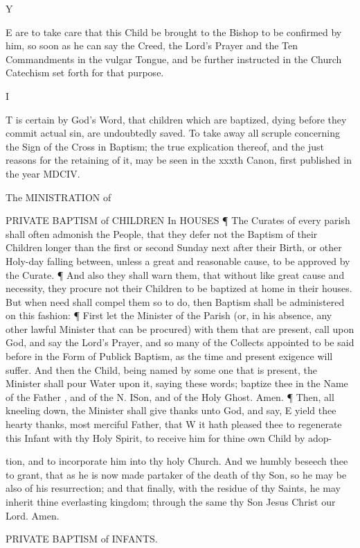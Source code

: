 Y

E are to take care that this Child be brought to the Bishop to be confirmed by him, so soon as he can say the Creed, the Lord’s Prayer and the Ten Commandments in the vulgar Tongue, and be further instructed in the Church Catechism set forth for that purpose.

I

T is certain by God’s Word, that children which are baptized, dying before they commit actual sin, are undoubtedly saved. To take away all scruple concerning the Sign of the Cross in Baptism; the true explication thereof, and the just reasons for the retaining of it, may be seen in the xxxth Canon, first published in the year MDCIV.

The MINISTRATION of

PRIVATE BAPTISM of CHILDREN In HOUSES ¶ The Curates of every parish shall often admonish the People, that they defer not the Baptism of their Children longer than the first or second Sunday next after their Birth, or other Holy-day falling between, unless a great and reasonable cause, to be approved by the Curate. ¶ And also they shall warn them, that without like great cause and necessity, they procure not their Children to be baptized at home in their houses. But when need shall compel them so to do, then Baptism shall be administered on this fashion: ¶ First let the Minister of the Parish (or, in his absence, any other lawful Minister that can be procured) with them that are present, call upon God, and say the Lord’s Prayer, and so many of the Collects appointed to be said before in the Form of Publick Baptism, as the time and present exigence will suffer. And then the Child, being named by some one that is present, the Minister shall pour Water upon it, saying these words; baptize thee in the Name of the Father , and of the N. ISon, and of the Holy Ghost. Amen. ¶ Then, all kneeling down, the Minister shall give thanks unto God, and say, E yield thee hearty thanks, most merciful Father, that W it hath pleased thee to regenerate this Infant with thy Holy Spirit, to receive him for thine own Child by adop-

tion, and to incorporate him into thy holy Church. And we humbly beseech thee to grant, that as he is now made partaker of the death of thy Son, so he may be also of his resurrection; and that finally, with the residue of thy Saints, he may inherit thine everlasting kingdom; through the same thy Son Jesus Christ our Lord. Amen.

PRIVATE BAPTISM of INFANTS.

